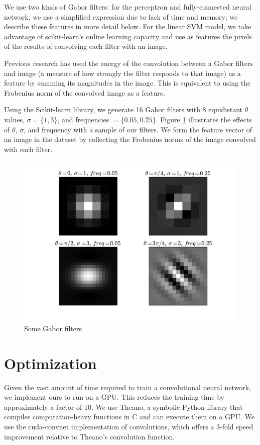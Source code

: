 \documentclass{acm_proc_article-sp}
\begin{document}
We use two kinds of Gabor filters: for the perceptron and fully-connected neural network, we use a simplified expression due to lack of time and memory; we describe these features in more detail below. For the linear SVM model, we take advantage of scikit-learn's online learning capacity and use as features the pixels of the results of convolving each filter with an image.

Previous research has used the energy of the convolution between a Gabor filters and image (a measure of how strongly the filter responds to that image\cite{Grigorescu}) as a feature by summing its magnitudes in the image.\cite{Bau} This is equivalent to using the Frobenius norm of the convolved image as a feature. 

Using the Scikit-learn library\cite{scikit-learn}, we generate 16 Gabor filters with 8 equidistant $\theta$ values, $\sigma = \{1, 3\}$, and frequencies $= \{0.05, 0.25\}$. Figure \ref{fig:gabor} illustrates the effects of $\theta$, $\sigma$, and frequency with a sample of our filters. We form the feature vector of an image in the dataset by collecting the Frobenius norms of the image convolved with each filter. 

\begin{figure}[h]
	\centering
	\includegraphics[width=\linewidth]{gabors}
  	\caption{Some Gabor filters}
  	\label{fig:gabor}
\end{figure}



\section{Optimization} 
Given the vast amount of time required to train a convolutional neural network, we implement ours to run on a GPU. This reduces the training time by approximately a factor of 10. We use Theano\cite{Theano}, a symbolic Python library that compiles computation-heavy functions in C and can execute them on a GPU. We use the cuda-convnet implementation of convolutions\cite{Krizhevsky}, which offers a 3-fold speed improvement relative to Theano's convolution function.
\end{document}
